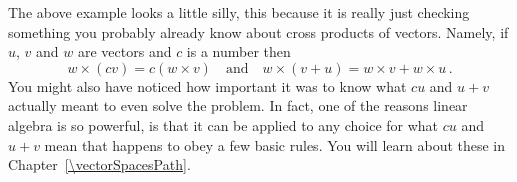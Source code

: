 \begin{example}
\end{example} 
The above example looks a little silly, this because it is really just checking something you probably already know about cross products of vectors. Namely, if $u$, $v$ and $w$ are vectors and $c$ is a number then
$$
w\times(cv)=c(w\times v)\quad\mbox{and}\quad  w\times(v+u)=w\times v+w\times u\, .
$$
You might also have noticed how important it was to know what $cu$ and $u+v$ actually meant to even solve the problem.
In fact, one of the reasons linear algebra is so powerful, is that it can be applied to any choice for what $cu$ and $u+v$ mean
that happens to obey a few basic rules. You will learn about these in Chapter~\ref{\vectorSpacesPath}.

